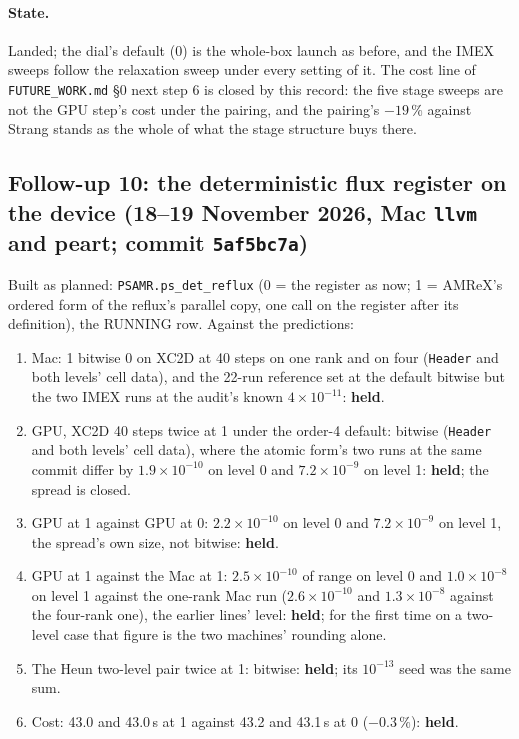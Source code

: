 \documentclass[11pt,a4paper]{article}
\newcommand{\code}[1]{\texttt{\small #1}}
\begin{document}
\paragraph{State.}  Landed; the dial's default (0) is the whole-box
launch as before, and the IMEX sweeps follow the relaxation sweep under
every setting of it.  The cost line of \code{FUTURE\_WORK.md} \S0 next
step 6 is closed by this record: the five stage sweeps are not the GPU
step's cost under the pairing, and the pairing's $-19\,\%$ against
Strang stands as the whole of what the stage structure buys there.


\subsection{Follow-up 10: the deterministic flux register on the device (18--19 November 2026, Mac \code{llvm} and peart; commit \code{5af5bc7a})}
\label{sec:fu10}

Built as planned: \code{PSAMR.ps\_det\_reflux} (0 = the register as now;
1 = AMReX's ordered form of the reflux's parallel copy, one call on the
register after its definition), the RUNNING row.  Against the
predictions:
\begin{enumerate}[nosep]
\item Mac: 1 bitwise 0 on XC2D at 40 steps on one rank and on four
      (\code{Header} and both levels' cell data), and the 22-run
      reference set at the default bitwise but the two IMEX runs at the
      audit's known $4\times10^{-11}$: \textbf{held}.
\item GPU, XC2D 40 steps twice at 1 under the order-4 default: bitwise (\code{Header} and both levels' cell data), where the atomic form's two runs at the same commit differ by $1.9\times10^{-10}$ on level 0 and $7.2\times10^{-9}$ on level 1: \textbf{held}; the spread is closed.
\item GPU at 1 against GPU at 0: $2.2\times10^{-10}$ on level 0 and $7.2\times10^{-9}$ on level 1, the spread's own size, not bitwise: \textbf{held}.
\item GPU at 1 against the Mac at 1: $2.5\times10^{-10}$ of range on level 0 and $1.0\times10^{-8}$ on level 1 against the one-rank Mac run ($2.6\times10^{-10}$ and $1.3\times10^{-8}$ against the four-rank one), the earlier lines' level: \textbf{held}; for the first time on a two-level case that figure is the two machines' rounding alone.
\item The Heun two-level pair twice at 1: bitwise: \textbf{held}; its $10^{-13}$ seed was the same sum.
\item Cost: 43.0 and 43.0\,s at 1 against 43.2 and 43.1\,s at 0 ($-0.3\,\%$): \textbf{held}.
\end{enumerate}
\end{document}
